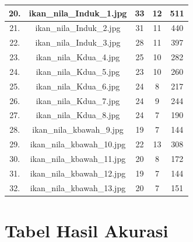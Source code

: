 \begin{longtable}{|c|c|c|c|c|}
        \hline
        20. & ikan\_nila\_Induk\_1.jpg & 33 & 12 & 511 \\
        \hline
        21. & ikan\_nila\_Induk\_2.jpg & 31 & 11 & 440 \\
        \hline
        22. & ikan\_nila\_Induk\_3.jpg & 28 & 11 & 397 \\
        \hline
        23. & ikan\_nila\_Kdua\_4.jpg & 25 & 10 & 282 \\
        \hline
        24. & ikan\_nila\_Kdua\_5.jpg & 23 & 10 & 260 \\
        \hline
        25. & ikan\_nila\_Kdua\_6.jpg & 24 & 8 & 217 \\
        \hline
        26. & ikan\_nila\_Kdua\_7.jpg & 24 & 9 & 244 \\
        \hline
        27. & ikan\_nila\_Kdua\_8.jpg & 24 & 7 & 190 \\
        \hline
        28. & ikan\_nila\_kbawah\_9.jpg & 19 & 7 & 144 \\
        \hline
        29. & ikan\_nila\_kbawah\_10.jpg & 22 & 13 & 308 \\
        \hline
        30. & ikan\_nila\_kbawah\_11.jpg & 20 & 8 & 172 \\
        \hline
        31. & ikan\_nila\_kbawah\_12.jpg & 19 & 7 & 144 \\
        \hline
        32. & ikan\_nila\_kbawah\_13.jpg & 20 & 7 & 151 \\
        \hline
\end{longtable}

\chapter{Tabel Hasil Akurasi}

